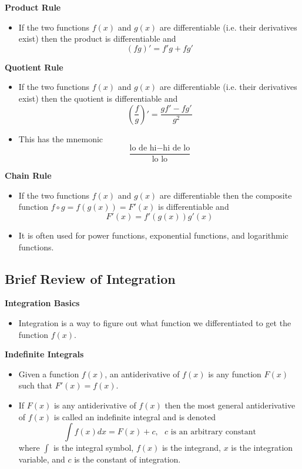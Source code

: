 \documentclass[11pt]{article}
\begin{document}
\textbf{Product Rule}
\begin{itemize}
    \item If the two functions $f(x)$ and $g(x)$ are differentiable (i.e. their derivatives
    exist) then the product is differentiable and 
    \[(fg)' = f'g + fg'\]
\end{itemize}

\textbf{Quotient Rule}
\begin{itemize}
    \item If the two functions $f(x)$ and $g(x)$ are differentiable (i.e. their derivatives
    exist) then the quotient is differentiable and 
    \[\left(\frac{f}{g}\right)' = \frac{gf' - fg'}{g^2}\]
    \item This has the mnemonic
    \[\frac{\text{lo de hi} - \text{hi de lo}}{\text{lo lo}}\]
\end{itemize}

\textbf{Chain Rule}
\begin{itemize}
    \item  If the two functions $f(x)$ and $g(x)$ are differentiable then the composite
    function $f \circ g = f(g(x)) = F'(x)$ is differentiable and 
    \[ F'(x) = f'(g(x))g'(x)\]
    \item It is often used for power functions, exponential functions, and logarithmic 
    functions.
\end{itemize}

\subsection{Brief Review of Integration}

\textbf{Integration Basics}
\begin{itemize}
    \item Integration is a way to figure out what function we differentiated to get the 
    function $f(x)$.
\end{itemize}

\textbf{Indefinite Integrals}
\begin{itemize}
    \item Given a function $f(x)$, an antiderivative of $f(x)$ is any function $F(x)$ such 
    that $F'(x) = f(x)$. 
    \item If $F(x)$ is any antiderivative of $f(x)$ then the most general antiderivative of 
    $f(x)$ is called an indefinite integral and is denoted 
    \[\int f(x) dx = F(x) + c, \ \ \ c\text{ is an arbitrary constant}\]
    where $\int$ is the integral symbol, $f(x)$ is the integrand, $x$ is the integration 
    variable, and $c$ is the constant of integration. 
\end{itemize}
\end{document}

